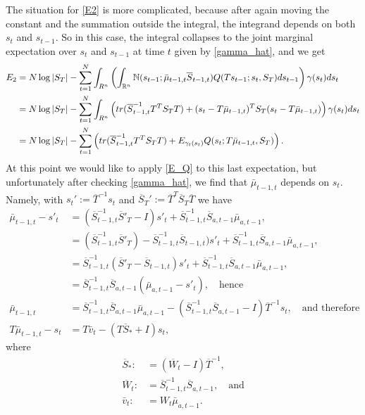 \documentclass[12pt,leqno]{article}
\begin{document}
The situation for \eqref{E2} is more complicated, because after again moving the constant and the summation outside
the integral, the integrand depends on both $s_t$ and $s_{t-1}$.  So in this case, the integral collapses to the 
joint marginal expectation over $s_t$ and $s_{t-1}$ at time $t$ given by \eqref{gamma_hat}, and we get
\begin{equation}\label{E2:1}
  \begin{split}
    E_2 &= N\log|S_T| - \sum_{t=1}^N\int_{R^n}\left(\int_{{\mathbb R}^{n}}{\mathbb N}(s_{t-1};\bar{\mu}_{t-1,t}\overline{S}_{t-1,t})Q(Ts_{t-1};s_t,S_T)ds_{t-1}\right)\gamma(s_t)ds_t\\
    &= N\log|S_T|-\sum_{t=1}^N\int_{R^n}\left(tr(\overline{S}_{t-1,t}^{-1}T^TS_TT) +
    (s_t - T\bar{\mu}_{t-1,t})^TS_T(s_t-T\bar{\mu}_{t-1,t})\right)\gamma(s_t)ds_t\\
    &= N\log|S_T|-\sum_{t=1}^N\left(tr(\overline{S}_{t-1,t}^{-1}T^TS_TT) + E_{\gamma_t(s_t)}Q(s_t;T\bar{\mu}_{t-1,t},S_T)\right).\\
    \end{split}
\end{equation}
At this point we would like to apply \eqref{E_Q} to this last expectation, but unfortunately after checking \eqref{gamma_hat},
we find that $\bar{\mu}_{t-1,t}$ depends on $s_t$.  Namely, with $s_t' := \overline{T}^{-1}s_t$ and
$\overline{S}_T' := \overline{T}^T\overline{S}_T\overline{T}$ we have
\begin{align*}
\bar{\mu}_{t-1,t}-s'_t &= (\overline{S}_{t-1,t}^{-1}\overline{S}'_T - I)s'_t +
  \overline{S}_{t-1,t}^{-1}\overline{S}_{a,t-1}\bar{\mu}_{a,t-1}, \\
  &= (\overline{S}_{t-1,t}^{-1}\overline{S}'_T) - \overline{S}_{t-1,t}^{-1}\overline{S}_{t-1,t})s'_t +
  \overline{S}_{t-1,t}^{-1}\overline{S}_{a,t-1}\bar{\mu}_{a,t-1}, \\
    &= \overline{S}_{t-1,t}^{-1}(\overline{S}'_T - \overline{S}_{t-1,t} )s'_t + \overline{S}_{t-1,t}^{-1}\overline{S}_{a,t-1}\bar{\mu}_{a,t-1}, \\
    &= \overline{S}_{t-1,t}^{-1}\overline{S}_{a,t-1}(\bar{\mu}_{a,t-1}-s'_t), \quad\text{hence}\\
    \bar{\mu}_{t-1,t} &= \overline{S}_{t-1,t}^{-1}\overline{S}_{a,t-1}\bar{\mu}_{a,t-1} - (\overline{S}_{t-1,t}^{-1}\overline{S}_{a,t-1}-I)\overline{T}^{-1}s_t,\quad\text{and therefore}\\
    T\bar{\mu}_{t-1,t} - s_t &= T\bar{v}_t - (T\overline{S}_* + I)s_t, 
  \end{align*}
where
\begin{align*}
  \overline{S}_* :&= (\overline{W}_t - I)\overline{T}^{-1} ,\\
  \overline{W}_t :&= \overline{S}_{t-1,t}^{-1}\overline{S}_{a,t-1},\quad\text{and}\\
  \bar{v}_t :&= W_t\bar{\mu}_{a,t-1}.
\end{align*}
\end{document}
